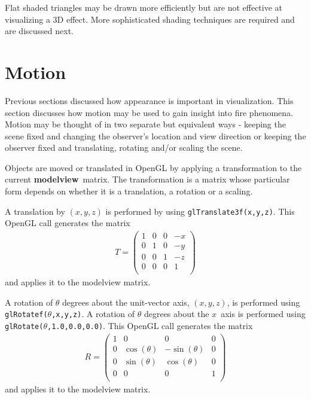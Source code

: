 \documentclass[11pt,twoside]{book}
\begin{document}
Flat shaded triangles may be drawn more efficiently but are not
effective at visualizing a 3D effect.  More sophisticated shading
techniques are required and are discussed next.

%
%

\section{Motion} Previous sections discussed how appearance is important
in visualization.  This section discusses how motion may be used to gain
insight into fire phenomena.  Motion may be thought of in two separate but
equivalent ways - keeping the scene fixed and changing the observer's location
and view direction or keeping the observer fixed and translating, rotating
and/or scaling the scene.

Objects are moved or translated in OpenGL by applying a transformation to
the current {\bf modelview}\ matrix.  The transformation is a matrix whose
particular form depends on whether it is a translation, a rotation or a scaling.

A translation by $(x,y,z)$ is performed by using {\tt glTranslate3f(x,y,z)}.
This OpenGL call generates the matrix
\begin{eqnarray}
T=\left(%
\begin{array}{cccc}
  1 & 0 & 0 & -x \\
  0 & 1 & 0 & -y \\
  0 & 0 & 1 & -z \\
  0 & 0 & 0 & 1 \\
\end{array}%
\right)
\end{eqnarray}
and applies it to the modelview matrix.

A rotation of $\theta$ degrees about the unit-vector axis, $(x,y,z)$,
is performed using {\tt glRotatef($\theta$,x,y,z)}.  A rotation of
$\theta$ degrees about the $x$~axis is performed using {\tt glRotate($\theta$,1.0,0.0,0.0)}.
This OpenGL call generates the matrix
\begin{eqnarray}
R=\left(%
\begin{array}{cccc}
  1 & 0 & 0 & 0 \\
  0 & \cos(\theta) & -\sin(\theta) & 0 \\
  0 & \sin(\theta) & \cos(\theta) & 0 \\
  0 & 0 & 0 & 1 \\
\end{array}%
\right)
\end{eqnarray}
and applies it to the modelview matrix.
\end{document}
